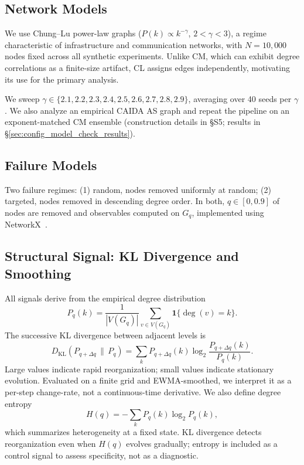 \documentclass{nws}
\begin{document}
\subsection{Network Models}

We use Chung--Lu power-law graphs ($P(k)\propto k^{-\gamma}$, $2<\gamma<3$), a regime
characteristic of infrastructure and communication networks, with $N=10{,}000$ nodes fixed
across all synthetic experiments. Unlike CM,
which can exhibit degree correlations as a finite-size artifact, CL assigns edges
independently, motivating its use for the primary analysis.

We sweep $\gamma \in \{2.1, 2.2, 2.3, 2.4, 2.5, 2.6, 2.7, 2.8, 2.9\}$, averaging over
40 seeds per $\gamma$. We also analyze an empirical CAIDA AS graph and repeat the pipeline
on an exponent-matched CM ensemble (construction details in \S S5;
results in \S\ref{sec:config_model_check_results}).

\subsection{Failure Models}

Two failure regimes: (1) random, nodes removed uniformly at random; (2) targeted,
nodes removed in descending degree order. In both, $q \in [0, 0.9]$ of nodes are removed
and observables computed on $G_q$, implemented using NetworkX~\citep{SciPyProceedings_11}.

\subsection{Structural Signal: KL Divergence and Smoothing}

All signals derive from the empirical degree distribution
\[
P_q(k) = \frac{1}{|V(G_q)|} \sum_{v \in V(G_q)} \mathbf{1}\{\deg(v) = k\}.
\]
The successive KL divergence between adjacent levels is
\[
D_{\mathrm{KL}}\!\left(P_{q+\Delta q} \,\|\, P_q\right)
=
\sum_k
P_{q+\Delta q}(k)
\log_2
\frac{P_{q+\Delta q}(k)}{P_q(k)}.
\]
Large values indicate rapid reorganization; small values indicate stationary evolution.
Evaluated on a finite grid and EWMA-smoothed, we interpret it as a per-step change-rate,
not a continuous-time derivative. We also define degree entropy
\[
H(q) = -\sum_k P_q(k)\log_2 P_q(k),
\]
which summarizes heterogeneity at a fixed state. KL divergence detects reorganization even when $H(q)$ evolves gradually; entropy is included as a control signal to assess specificity, not as a diagnostic.
\end{document}
